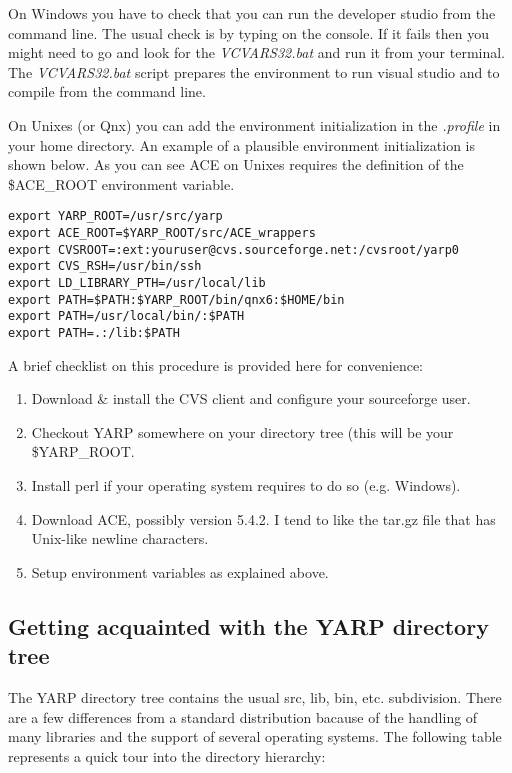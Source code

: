 On Windows you have to check that you can run the developer studio from the command line. The usual check is by typing  on the console. If it fails then you might need to go and look for the {\em VCVARS32.bat} and run it from your terminal. The {\em VCVARS32.bat} script prepares the environment to run visual studio and to compile from the command line.

On Unixes (or Qnx) you can add the environment initialization in the {\em .profile} in your home directory. An example of a plausible environment initialization is shown below. As you can see ACE on Unixes requires the definition of the \$ACE\_ROOT environment variable.

\begin{verbatim}
export YARP_ROOT=/usr/src/yarp
export ACE_ROOT=$YARP_ROOT/src/ACE_wrappers
export CVSROOT=:ext:youruser@cvs.sourceforge.net:/cvsroot/yarp0
export CVS_RSH=/usr/bin/ssh
export LD_LIBRARY_PTH=/usr/local/lib
export PATH=$PATH:$YARP_ROOT/bin/qnx6:$HOME/bin
export PATH=/usr/local/bin/:$PATH
export PATH=.:/lib:$PATH
\end{verbatim}

A brief checklist on this procedure is provided here for convenience:
\begin{enumerate}
	\item Download \& install the CVS client and configure your sourceforge user.
	\item Checkout YARP  somewhere on your directory tree (this will be your \$YARP\_ROOT.
	\item Install perl if your operating system requires to do so (e.g. Windows).
	\item Download ACE, possibly version 5.4.2. I tend to like the tar.gz file that has Unix-like newline characters.
	\item Setup environment variables as explained above.
\end{enumerate}

\subsection{Getting acquainted with the YARP directory tree}
The YARP directory tree contains the usual src, lib, bin, etc. subdivision. There are a few differences from a standard distribution bacause of the handling of many libraries and the support of several operating systems. The following table represents a quick tour into the directory hierarchy:

